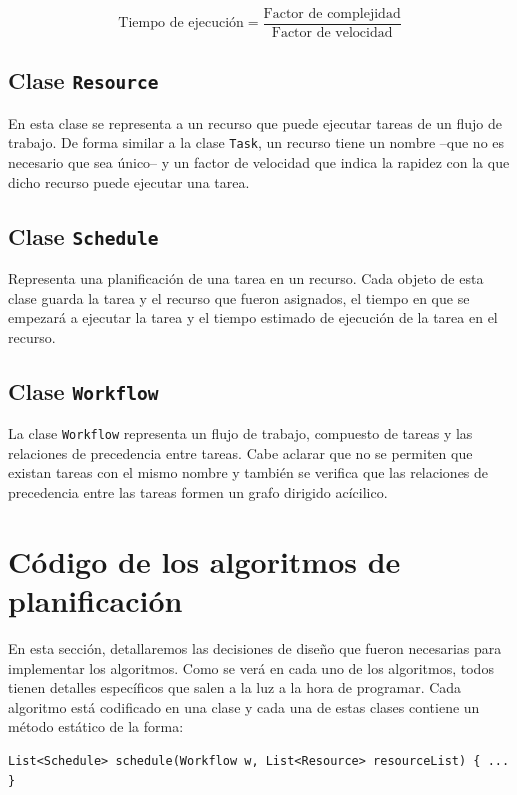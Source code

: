 \begin{equation}
\text{Tiempo de ejecución} = \frac{\text{Factor de complejidad}}{\text{Factor de velocidad}}
\end{equation}

\subsection{Clase \texttt{Resource}}
En esta clase se representa a un recurso que puede ejecutar tareas de un flujo de trabajo. De forma similar a la clase \texttt{Task}, un recurso tiene un nombre --que no es necesario que sea único-- y un factor de velocidad que indica la rapidez con la que dicho recurso puede ejecutar una tarea.

\subsection{Clase \texttt{Schedule}}
Representa una planificación de una tarea en un recurso. Cada objeto de esta clase guarda la tarea y el recurso que fueron asignados, el tiempo en que se empezará a ejecutar la tarea y el tiempo estimado de ejecución de la tarea en el recurso.

\subsection{Clase \texttt{Workflow}}
La clase \texttt{Workflow} representa un flujo de trabajo, compuesto de tareas y las relaciones de precedencia entre tareas. Cabe aclarar que no se permiten que existan tareas con el mismo nombre y también se verifica que las relaciones de precedencia entre las tareas formen un grafo dirigido acícilico.

\section{Código de los algoritmos de planificación}
En esta sección, detallaremos las decisiones de diseño que fueron necesarias para implementar los algoritmos. Como se verá en cada uno de los algoritmos, todos tienen detalles específicos que salen a la luz a la hora de programar. Cada algoritmo está codificado en una clase y cada una de estas clases contiene un método estático de la forma:

\begin{lstlisting}[numbers=none]
List<Schedule> schedule(Workflow w, List<Resource> resourceList) { ... }
\end{lstlisting}

